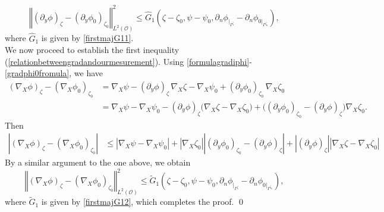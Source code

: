 \documentclass[11pt]{article}
\begin{document}
$$\left\Vert (\partial_y\phi)_{\zeta}-(\partial_y\phi_0)_{\zeta_0} \right\Vert_{L^{2}(\mathcal O )}^2\leq \widehat{G}_1(\zeta-\zeta_0, \psi-\psi_0 ,\partial_n\phi_{|_{\Gamma^{\zeta   }    }}-\partial_n\phi_{0|_{\Gamma^{\zeta_0   }    }} ),$$
where $\widehat{G}_1$ is given by \eqref{firstmajG11}.\\
We now proceed to establish the first inequality (\ref{relationbetweengradandourmesurement}). Using \eqref{formulagradiphi}-\eqref{gradphi0fromula}, we have
\begin{equation*}
	\begin{split}
		(\nabla_X \phi)_{\zeta}- (\nabla_X \phi_0)_{\zeta_0}&=\nabla_X \psi-(\partial_y\phi)_{\zeta}\,\nabla_X\zeta-\nabla_X \psi_0+(\partial_y\phi_0)_{\zeta_0}\,\nabla_X\zeta_0\\
		&=\nabla_X \psi-\nabla_X \psi_0-(\partial_y\phi)_{\zeta}\big(\nabla_X \zeta -\nabla_X \zeta_0\big)+\big((\partial_y\phi_0)_{\zeta_0}-(\partial_y\phi)_{\zeta} \big)\nabla_X\zeta_0.
	\end{split}
\end{equation*}
Then 
\begin{equation*}
	\begin{split}
		\left| (\nabla_X \phi)_{\zeta}- (\nabla_X \phi_0)_{\zeta_0}\right|&\leq \left|\nabla_X \psi-\nabla_X \psi_0 \right|+\left|\nabla_X \zeta_0\right| \left|(\partial_y\phi_0)_{\zeta_0}-(\partial_y\phi)_{\zeta} \right|+ \left| (\partial_y\phi)_{\zeta}\right| \left| \nabla_X \zeta -\nabla_X \zeta_0\right|
	\end{split}
\end{equation*}
By a similar argument to the one above, we obtain
$$\left\Vert (\nabla_X\phi)_{\zeta}-(\nabla_X\phi_0)_{\zeta_0} \right\Vert_{L^{2}(\mathcal O )}^2\leq \widetilde{G}_1(\zeta-\zeta_0, \psi-\psi_0 ,\partial_n\phi_{|_{\Gamma^{\zeta   }    }}-\partial_n\phi_{0|_{\Gamma^{\zeta_0   }    }} ),$$
where  $\widetilde{G}_1$ is given by \eqref{firstmajG12}, which completes the proof. \qed
\end{document}
